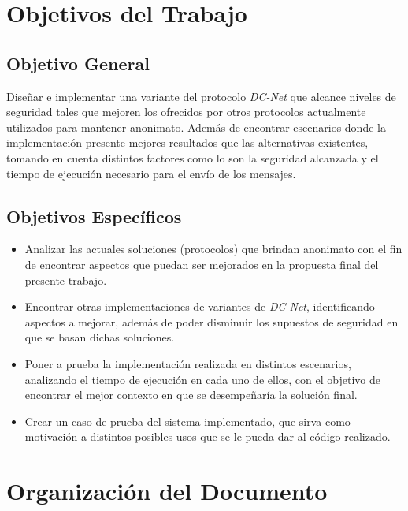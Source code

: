 \section{Objetivos del Trabajo}

\subsection{Objetivo General}

Diseñar e implementar una variante del protocolo \emph{DC-Net} que alcance niveles de seguridad tales que mejoren los ofrecidos por otros protocolos 
actualmente utilizados para mantener anonimato. Además de encontrar escenarios donde la implementación presente mejores resultados que las 
alternativas existentes, tomando en cuenta distintos factores como lo son la seguridad alcanzada y el tiempo de ejecución necesario para el envío de los mensajes.

\subsection{Objetivos Específicos}

\begin{itemize}
    \item Analizar las actuales soluciones (protocolos) que brindan anonimato con el fin de encontrar aspectos que puedan ser mejorados en la propuesta 
    final del presente trabajo.
    \item Encontrar otras implementaciones de variantes de \emph{DC-Net}, identificando aspectos a mejorar, además de poder disminuir los supuestos de 
    seguridad en que se basan dichas soluciones.
    \item Poner a prueba la implementación realizada en distintos escenarios, analizando el tiempo de ejecución en cada uno de ellos, con el objetivo 
    de encontrar el mejor contexto en que se desempeñaría la solución final.
    \item Crear un caso de prueba del sistema implementado, que sirva como motivación a distintos posibles usos que se le pueda dar al código realizado.
\end{itemize}

\section{Organización del Documento}

